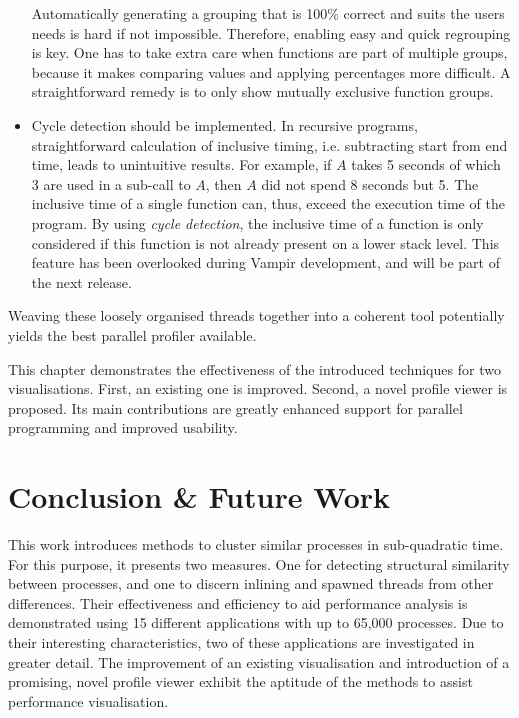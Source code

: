 \documentclass[a4paper, final, diplominf]{zih-template}
\begin{document}
\begin{itemize}
		Automatically generating a grouping that is 100\% correct and suits the users needs is hard if not impossible.
		Therefore, enabling easy and quick regrouping is key.
		One has to take extra care when functions are part of multiple groups, because it makes comparing values and applying percentages more difficult.
		A straightforward remedy is to only show mutually exclusive function groups.\vspace{-0.5ex}
	\item Cycle detection should be implemented.
		In recursive programs, straightforward calculation of inclusive timing, i.e. subtracting start from end time, leads to unintuitive results.
		For example, if $A$ takes 5 seconds of which 3 are used in a sub-call to $A$, then $A$ did not spend 8 seconds but 5.
		The inclusive time of a single function can, thus, exceed the execution time of the program.
		By using \emph{cycle detection}, the inclusive time of a function is only considered if this function is not already present on a lower stack level.
		This feature has been overlooked during Vampir development, and will be part of the next release.
\end{itemize}
Weaving these loosely organised threads together into a coherent tool potentially yields the best parallel profiler available.

This chapter demonstrates the effectiveness of the introduced techniques for two visualisations.
First, an existing one is improved.
Second, a novel profile viewer is proposed.
Its main contributions are greatly enhanced support for parallel programming and improved usability.

\chapter{Conclusion \& Future Work}
\label{sec:conclusion}
This work introduces methods to cluster similar processes in sub-quadratic time.
For this purpose, it presents two measures.
One for detecting structural similarity between processes, and one to discern inlining and spawned threads from other differences.
Their effectiveness and efficiency to aid performance analysis is demonstrated using 15 different applications with up to 65,000 processes.
Due to their interesting characteristics, two of these applications are investigated in greater detail.
The improvement of an existing visualisation and introduction of a promising, novel profile viewer exhibit the aptitude of the methods to assist performance visualisation.
\end{document}
